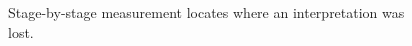 \begin{figure}[H]
\centering
{}
\caption{Stage-by-stage measurement locates where an interpretation was lost.}\label{fig:teach-M09-10}
\end{figure}
